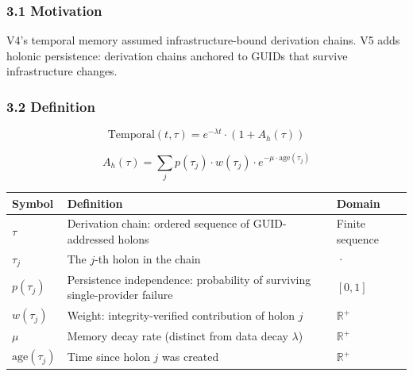 \documentclass[
]{article}
\newcounter{none} %
\begin{document}
\subsubsection{3.1 Motivation}\label{motivation}

V4's temporal memory assumed infrastructure-bound derivation chains. V5
adds holonic persistence: derivation chains anchored to GUIDs that
survive infrastructure changes.

\subsubsection{3.2 Definition}\label{definition}

\[\text{Temporal}(t, \tau) = e^{-\lambda t} \cdot (1 + A_h(\tau))\]

\[A_h(\tau) = \sum_j p(\tau_j) \cdot w(\tau_j) \cdot e^{-\mu \cdot \text{age}(\tau_j)}\]

{\def\LTcaptype{none} %
\begin{longtable}[]{@{}
  >{\raggedright\arraybackslash}p{}
  >{\raggedright\arraybackslash}p{}
  >{\raggedright\arraybackslash}p{}@{}}
\toprule\noalign{}
\begin{minipage}[b]{\linewidth}\raggedright
Symbol
\end{minipage} & \begin{minipage}[b]{\linewidth}\raggedright
Definition
\end{minipage} & \begin{minipage}[b]{\linewidth}\raggedright
Domain
\end{minipage} \\
\midrule\noalign{}
\endhead
\bottomrule\noalign{}
\endlastfoot
\(\tau\) & Derivation chain: ordered sequence of GUID-addressed holons &
Finite sequence \\
\(\tau_j\) & The \(j\)-th holon in the chain & · \\
\(p(\tau_j)\) & Persistence independence: probability of surviving
single-provider failure & \([0, 1]\) \\
\(w(\tau_j)\) & Weight: integrity-verified contribution of holon \(j\) &
\(\mathbb{R}^+\) \\
\(\mu\) & Memory decay rate (distinct from data decay \(\lambda\)) &
\(\mathbb{R}^+\) \\
\(\text{age}(\tau_j)\) & Time since holon \(j\) was created &
\(\mathbb{R}^+\) \\
\end{longtable}
}
\end{document}
